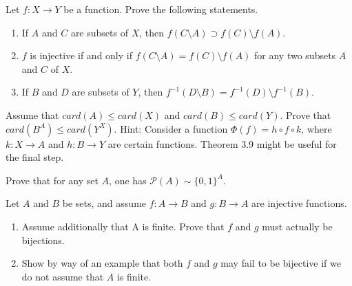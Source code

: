 \documentclass[12pt,letterpaper,boxed]{hmcpset}
\begin{document}
\begin{problem}[Exercise 3.6.]
Let $f: X \rightarrow Y$ be a function. Prove the following statements.
\vspace{-2mm}
\begin{enumerate}
	\itemsep0em
	\item If $A$ and $C$ are subsets of $X$, then $f(C\setminus A)\supset f(C)\setminus f(A)$.
	\item $f$ is injective if and only if $f(C\setminus A) = f(C)\setminus f(A)$ for any two subsets $A$ and $C$ of $X.$
	\item If $B$ and $D$ are subsets of $Y$, then $f^{-1}(D\setminus B)= f^{-1}(D)\setminus f^{-1}(B).$
\end{enumerate}
\end{problem}
\begin{solution}
\end{solution}

\begin{problem}[Exercise 4.5]
Assume that $card(A) \leq card(X)$ and $card(B) \leq card(Y).$ Prove that $card(B^{A}) \leq card(Y^{X})$. Hint: Consider a function $\Phi(f) = h \circ f \circ k$,
where $k : X \rightarrow A$ and $h : B \rightarrow Y$ are certain functions. Theorem 3.9 might be useful for the final step.
 \end{problem}

\begin{solution}
\end{solution}

\begin{problem}[Exercise 4.7]
Prove that for any set $A$, one has $\mathcal{P}(A) \sim \{0,1\}^{A}$.
\end{problem}

\begin{solution}
\end{solution}

\begin{problem}[Exercise 4.17]
Let $A$ and $B$ be sets, and assume $f: A \rightarrow B$ and $g: B \rightarrow A$ are injective functions.
\vspace{-2mm}
\begin{enumerate}
	\itemsep0em
	\item Assume additionally that A is finite. Prove that $f$ and $g$ must actually be bijections.
	\item Show by way of an example that both $f$ and $g$ may fail to be bijective if we do not assume that $A$ is finite.
\end{enumerate}
\end{problem}
\end{document}
